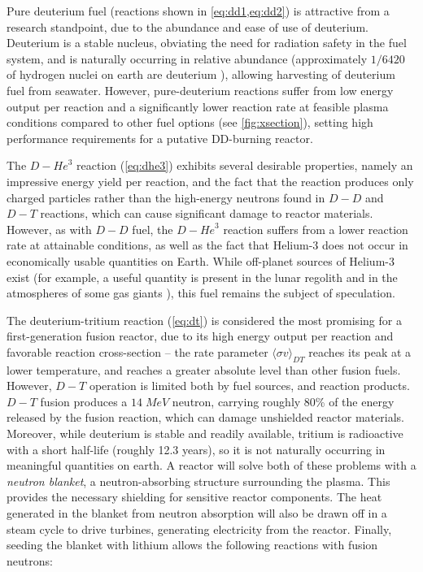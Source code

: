 Pure deuterium fuel (reactions shown in \cref{eq:dd1,eq:dd2}) is attractive from a research standpoint, due to the abundance and ease of use of deuterium.  Deuterium is a stable nucleus, obviating the need for radiation safety in the fuel system, and is naturally occurring in relative abundance (approximately $1/6420$ of hydrogen nuclei on earth are deuterium \cite{CRC}), allowing harvesting of deuterium fuel from seawater.  However, pure-deuterium reactions suffer from low energy output per reaction and a significantly lower reaction rate at feasible plasma conditions compared to other fuel options (see \cref{fig:xsection}), setting high performance requirements for a putative DD-burning reactor.

The $\si{D}-\si{He}^3$ reaction (\cref{eq:dhe3}) exhibits several desirable properties, namely an impressive energy yield per reaction, and the fact that the reaction produces only charged particles rather than the high-energy neutrons found in $\si{D}-\si{D}$ and $\si{D}-\si{T}$ reactions, which can cause significant damage to reactor materials.  However, as with $\si{D}-\si{D}$ fuel, the $\si{D}-\si{He}^3$ reaction suffers from a lower reaction rate at attainable conditions, as well as the fact that Helium-3 does not occur in economically usable quantities on Earth.  While off-planet sources of Helium-3 exist (for example, a useful quantity is present in the lunar regolith \cite{Fa2010} and in the atmospheres of some gas giants \cite{Palaszewski2005}), this fuel remains the subject of speculation.

The deuterium-tritium reaction (\cref{eq:dt}) is considered the most promising for a first-generation fusion reactor, due to its high energy output per reaction and favorable reaction cross-section -- the rate parameter $\langle \sigma v \rangle_{DT}$ reaches its peak at a lower temperature, and reaches a greater absolute level than other fusion fuels.  However, $\si{D}-\si{T}$ operation is limited both by fuel sources, and reaction products.  $\si{D}-\si{T}$ fusion produces a $14 \;\si{MeV}$ neutron, carrying roughly 80\% of the energy released by the fusion reaction, which can damage unshielded reactor materials.  Moreover, while deuterium is stable and readily available, tritium is radioactive with a short half-life (roughly 12.3 years), so it is not naturally occurring in meaningful quantities on earth.   A reactor will solve both of these problems with a \emph{neutron blanket}, a neutron-absorbing structure surrounding the plasma.  This provides the necessary shielding for sensitive reactor components.  
The heat generated in the blanket from neutron absorption will also be drawn off in a steam cycle to drive turbines, generating electricity from the reactor.  Finally, seeding the blanket with lithium allows the following reactions with fusion neutrons:

